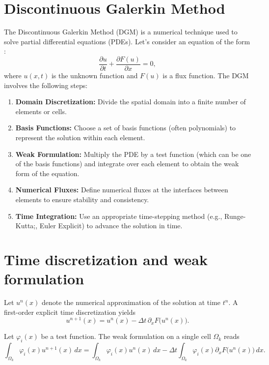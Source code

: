 \documentclass[11pt,a4paper]{report}
\theoremstyle{plain}
\theoremstyle{definition}
\begin{document}
\section{Discontinuous Galerkin Method \cite{HesthavenWarburton2008}}
The Discontinuous Galerkin Method (DGM) is a numerical technique used to solve partial differential equations (PDEs). 
Let's consider an equation of the form :
\begin{equation}
    \frac{\partial u}{\partial t} + \frac{\partial F(u)}{\partial x} = 0,
\end{equation}
where $u(x,t)$ is the unknown function and $F(u)$ is a flux function. \newline
The DGM involves the following steps:
\begin{enumerate}
    \item \textbf{Domain Discretization:} Divide the spatial domain into a finite number of elements or cells.
    \item \textbf{Basis Functions:} Choose a set of basis functions (often polynomials) to represent the solution within each element.
    \item  \textbf{Weak Formulation:} Multiply the PDE by a test function (which can be one of the basis functions) and integrate over each element to obtain the weak form of the equation.
    \item \textbf{Numerical Fluxes:} Define numerical fluxes at the interfaces between elements to ensure stability and consistency.
    \item \textbf{Time Integration:} Use an appropriate time-stepping method (e.g., Runge-Kutta;, Euler Explicit) to advance the solution in time.
\end{enumerate} 

\section{Time discretization and weak formulation}

Let $u^n(x)$ denote the numerical approximation of the solution at time $t^n$.
A first-order explicit time discretization yields
\begin{equation}
u^{n+1}(x) = u^n(x) - \Delta t \, \partial_x F\big(u^n(x)\big).
\label{eq:time_disc}
\end{equation}

Let $\varphi_i(x)$ be a test function. The weak formulation on a single cell
$\Omega_k$ reads
\begin{equation}
\int_{\Omega_k} \varphi_i(x) u^{n+1}(x)\, dx
=
\int_{\Omega_k} \varphi_i(x) u^n(x)\, dx
-
\Delta t \int_{\Omega_k} \varphi_i(x) \partial_x F\big(u^n(x)\big)\, dx.
\label{eq:weak_form_1}
\end{equation}
\end{document}
